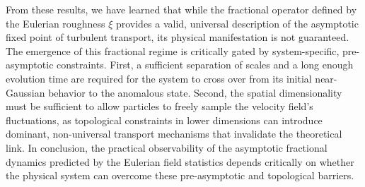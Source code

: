 \documentclass[]{article}
\begin{document}
From these results, we have learned that while the fractional operator defined by the Eulerian roughness $\xi$ provides a valid, universal description of the asymptotic fixed point of turbulent transport, its physical manifestation is not guaranteed. The emergence of this fractional regime is critically gated by system-specific, pre-asymptotic constraints. First, a sufficient separation of scales and a long enough evolution time are required for the system to cross over from its initial near-Gaussian behavior to the anomalous state. Second, the spatial dimensionality must be sufficient to allow particles to freely sample the velocity field's fluctuations, as topological constraints in lower dimensions can introduce dominant, non-universal transport mechanisms that invalidate the theoretical link. In conclusion, the practical observability of the asymptotic fractional dynamics predicted by the Eulerian field statistics depends critically on whether the physical system can overcome these pre-asymptotic and topological barriers.
\end{document}
